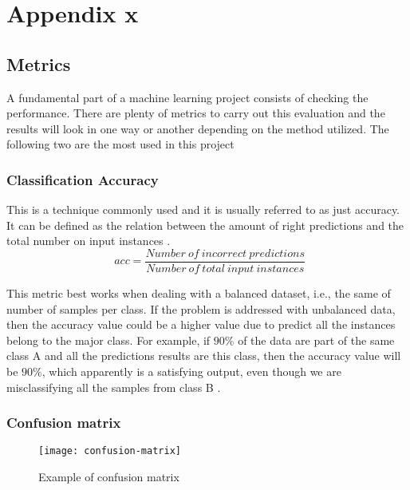 
\chapter* {Appendix x}

\section{Metrics}
\label{appendix:metrics}

	A fundamental part of a machine learning project consists of checking the performance. There are plenty of metrics to carry out this evaluation and the results will look in one way or another depending on the method utilized. The following two are the most used in this project
	
\subsection{Classification Accuracy}

	This is a technique commonly used and it is usually referred to as just accuracy. It can be defined as the relation between the amount of right predictions and the total number on input instances \cite{Scikit-learn}.
	\[
	\ \ acc = \frac{Number\ of\ incorrect\  predictions}{Number\ of\ total\ input\ instances}
	\]
	
	This metric best works when dealing with a balanced dataset, i.e., the same of number of samples per class.
	If the problem is addressed with unbalanced data, then the accuracy value could be a higher value due to predict all the instances belong to the major class. For example, if $90\%$ of the data are part of the same class A and all the predictions results are this class, then the accuracy value will be $90\%$, which apparently is a satisfying output, even though we are misclassifying all the samples from class B \cite{Mishra2018}. 
	
\subsection{Confusion matrix}

	\begin{figure}[b]
		\centering
		\captionsetup{justification=centering}
		\texttt{[image: confusion-matrix]}
		\caption{Example of confusion matrix}
		\label{fig:mesh6}
	\end{figure}

